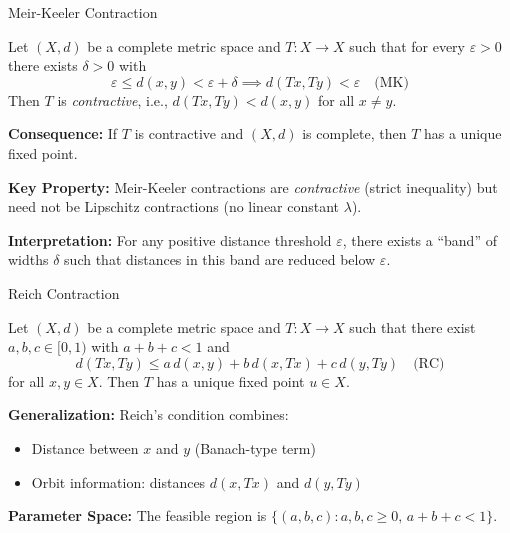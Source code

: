 \documentclass[aspectratio=169,10pt]{beamer}
\begin{document}
\begin{frame}{Meir-Keeler Contraction}
  \begin{theorem}
    Let $(X, d)$ be a complete metric space and $T : X \to X$ such that for every
    $\varepsilon > 0$ there exists $\delta > 0$ with
    \[
      \varepsilon \leq d(x,y) < \varepsilon + \delta \implies d(Tx, Ty) < \varepsilon \quad \text{(MK)}
    \]
    Then $T$ is \emph{contractive}, i.e., $d(Tx, Ty) < d(x,y)$ for all $x \neq y$.
  \end{theorem}

  \vspace{0.3cm}

  \textbf{Consequence:} If $T$ is contractive and $(X,d)$ is complete, then $T$ has a unique
  fixed point.

  \vspace{0.3cm}

  \textbf{Key Property:} Meir-Keeler contractions are \emph{contractive} (strict inequality)
  but need not be Lipschitz contractions (no linear constant $\lambda$).

  \vspace{0.3cm}

  \textbf{Interpretation:} For any positive distance threshold $\varepsilon$, there exists
  a ``band'' of widths $\delta$ such that distances in this band are reduced below $\varepsilon$.
\end{frame}

\begin{frame}{Reich Contraction}
  \begin{theorem}[Reich, 1971]
    Let $(X, d)$ be a complete metric space and $T : X \to X$ such that there exist
    $a, b, c \in [0,1)$ with $a + b + c < 1$ and
    \[
      d(Tx, Ty) \leq a \, d(x,y) + b \, d(x, Tx) + c \, d(y, Ty) \quad \text{(RC)}
    \]
    for all $x, y \in X$. Then $T$ has a unique fixed point $u \in X$.
  \end{theorem}

  \vspace{0.3cm}

  \textbf{Generalization:} Reich's condition combines:
  \begin{itemize}
    \item Distance between $x$ and $y$ (Banach-type term)
    \item Orbit information: distances $d(x, Tx)$ and $d(y, Ty)$
  \end{itemize}

  \vspace{0.3cm}

  \textbf{Parameter Space:} The feasible region is $\{(a,b,c) : a,b,c \geq 0, \, a+b+c < 1\}$.
\end{frame}
\end{document}
